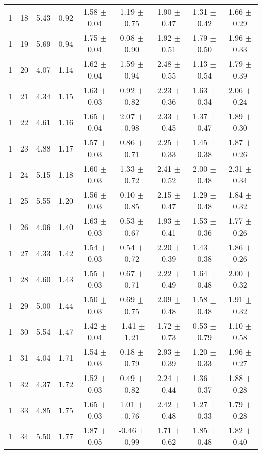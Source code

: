 \begin{landscape}
\begin{longtable}{ccccccccc}
   1 & 18 & 5.43 & 0.92 & 1.58 $\pm$ 0.04 & 1.19 $\pm$ 0.75 & 1.90 $\pm$ 0.47 & 1.31 $\pm$ 0.42 & 1.66 $\pm$ 0.29\\
   1 & 19 & 5.69 & 0.94 & 1.75 $\pm$ 0.04 & 0.08 $\pm$ 0.90 & 1.92 $\pm$ 0.51 & 1.79 $\pm$ 0.50 & 1.96 $\pm$ 0.33\\
   1 & 20 & 4.07 & 1.14 & 1.62 $\pm$ 0.04 & 1.59 $\pm$ 0.94 & 2.48 $\pm$ 0.55 & 1.13 $\pm$ 0.54 & 1.79 $\pm$ 0.39\\
   1 & 21 & 4.34 & 1.15 & 1.63 $\pm$ 0.03 & 0.92 $\pm$ 0.82 & 2.23 $\pm$ 0.36 & 1.63 $\pm$ 0.34 & 2.06 $\pm$ 0.24\\
   1 & 22 & 4.61 & 1.16 & 1.65 $\pm$ 0.04 & 2.07 $\pm$ 0.98 & 2.33 $\pm$ 0.45 & 1.37 $\pm$ 0.47 & 1.89 $\pm$ 0.30\\
   1 & 23 & 4.88 & 1.17 & 1.57 $\pm$ 0.03 & 0.86 $\pm$ 0.71 & 2.25 $\pm$ 0.33 & 1.45 $\pm$ 0.38 & 1.87 $\pm$ 0.26\\
   1 & 24 & 5.15 & 1.18 & 1.60 $\pm$ 0.03 & 1.33 $\pm$ 0.72 & 2.41 $\pm$ 0.52 & 2.00 $\pm$ 0.48 & 2.31 $\pm$ 0.34\\
   1 & 25 & 5.55 & 1.20 & 1.56 $\pm$ 0.03 & 0.10 $\pm$ 0.85 & 2.15 $\pm$ 0.47 & 1.29 $\pm$ 0.48 & 1.84 $\pm$ 0.32\\
   1 & 26 & 4.06 & 1.40 & 1.63 $\pm$ 0.03 & 0.53 $\pm$ 0.67 & 1.93 $\pm$ 0.41 & 1.53 $\pm$ 0.36 & 1.77 $\pm$ 0.26\\
   1 & 27 & 4.33 & 1.42 & 1.54 $\pm$ 0.03 & 0.54 $\pm$ 0.72 & 2.20 $\pm$ 0.39 & 1.43 $\pm$ 0.38 & 1.86 $\pm$ 0.26\\
   1 & 28 & 4.60 & 1.43 & 1.55 $\pm$ 0.03 & 0.67 $\pm$ 0.71 & 2.22 $\pm$ 0.49 & 1.64 $\pm$ 0.48 & 2.00 $\pm$ 0.32\\
   1 & 29 & 5.00 & 1.44 & 1.50 $\pm$ 0.03 & 0.69 $\pm$ 0.75 & 2.09 $\pm$ 0.48 & 1.58 $\pm$ 0.48 & 1.91 $\pm$ 0.32\\
   1 & 30 & 5.54 & 1.47 & 1.42 $\pm$ 0.04 & -1.41 $\pm$ 1.21 & 1.72 $\pm$ 0.73 & 0.53 $\pm$ 0.79 & 1.10 $\pm$ 0.58\\
   1 & 31 & 4.04 & 1.71 & 1.54 $\pm$ 0.03 & 0.18 $\pm$ 0.79 & 2.93 $\pm$ 0.39 & 1.20 $\pm$ 0.33 & 1.96 $\pm$ 0.27\\
   1 & 32 & 4.37 & 1.72 & 1.52 $\pm$ 0.03 & 0.49 $\pm$ 0.82 & 2.24 $\pm$ 0.44 & 1.36 $\pm$ 0.37 & 1.88 $\pm$ 0.28\\
   1 & 33 & 4.85 & 1.75 & 1.65 $\pm$ 0.03 & 1.01 $\pm$ 0.76 & 2.42 $\pm$ 0.48 & 1.27 $\pm$ 0.33 & 1.79 $\pm$ 0.28\\
   1 & 34 & 5.50 & 1.77 & 1.87 $\pm$ 0.05 & -0.46 $\pm$ 0.99 & 1.71 $\pm$ 0.62 & 1.85 $\pm$ 0.48 & 1.82 $\pm$ 0.40\\

\end{longtable}
\end{landscape}
